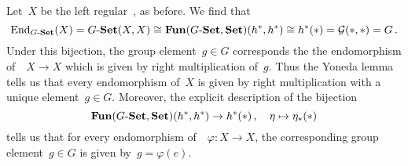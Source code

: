 \subsection{}

Let~$X$ be the left regular~, as before.
We find that
\[
        \operatorname{End}_{\text{$G$-$\mathbf{Set}$}}(X)
  =     \text{$G$-$\mathbf{Set}$}(X,X)
  \cong \mathbf{Fun}(\text{$G$-$\mathbf{Set}$}, \mathbf{Set})(h^\ast, h^\ast)
  \cong h^\ast(\ast)
  =     \mathcal{G}(\ast,\ast)
  =     G \,.
\]
Under this bijection, the group element~$g \in G$ corresponds the the endomorphism of~~$X \to X$ which is given by right multiplication of~$g$.
Thus the Yoneda lemma tells us that every endomorphism of~$X$ is given by right multiplication with a unique element~$g \in G$.
Moreover, the explicit description of the bijection
\[
          \mathbf{Fun}(\text{$G$-$\mathbf{Set}$}, \mathbf{Set})(h^\ast, h^\ast)
  \to     h^\ast(\ast) \,,
  \quad   \eta
  \mapsto \eta_\ast(\ast)
\]
tells us that for every endomorphism of~~$\varphi \colon X \to X$, the corresponding group element~$g \in G$ is given by~$g = \varphi(e)$.




